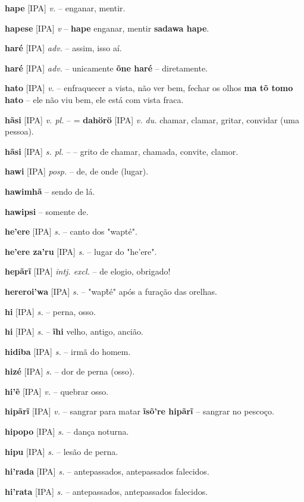 \textbf{hape} [IPA] \textit{v.} -- enganar, mentir.

\textbf{hapese} [IPA] \textit{v} -- \textbf{hape} enganar, mentir  \textbf{sadawa hape}.

\textbf{haré} [IPA] \textit{adv.} -- assim, isso aí.

\textbf{haré} [IPA] \textit{adv.} -- unicamente  \textbf{õne haré} -- diretamente.

\textbf{hato} [IPA] \textit{v.} -- enfraquecer a vista, não ver bem, fechar os olhos  \textbf{ma tõ tomo hato} -- ele não viu bem, ele está com vista fraca.

\textbf{hãsi} [IPA] \textit{v. pl.} -- = \textbf{dahörö} [IPA] \textit{v. du.} chamar, clamar, gritar, convidar (uma pessoa).

\textbf{hãsi} [IPA] \textit{s. pl.} -- -- grito de chamar, chamada, convite, clamor.

\textbf{hawi} [IPA] \textit{posp.} -- de, de onde (lugar).

\textbf{hawimhã} -- sendo de lá.

\textbf{hawipsi} -- somente de.

\textbf{he'ere} [IPA] \textit{s.} -- canto dos "wapté".

\textbf{he'ere za'ru} [IPA] \textit{s.} -- lugar do "he'ere".

\textbf{hepãrĩ} [IPA] \textit{intj. excl.} -- de elogio, obrigado!

\textbf{hereroi'wa} [IPA] \textit{s.} -- "wapt̃é" após a furação das orelhas.

\textbf{hi} [IPA] \textit{s.} -- perna, osso.

\textbf{hi} [IPA] \textit{s.} -- \textbf{ĩhi} velho, antigo, ancião.

\textbf{hidiba} [IPA] \textit{s.} -- irmã do homem.

\textbf{hizé} [IPA] \textit{s.} -- dor de perna (osso).

\textbf{hi'ẽ} [IPA] \textit{v.} -- quebrar osso.

\textbf{hipãrĩ} [IPA] \textit{v.} -- sangrar para matar  \textbf{ĩsõ're hipãrĩ} -- sangrar no pescoço.

\textbf{hipopo} [IPA] \textit{s.} -- dança noturna.

\textbf{hipu} [IPA] \textit{s.} -- lesão de perna.

\textbf{hi'rada} [IPA] \textit{s.} -- antepassados, antepassados falecidos.

\textbf{hi'rata} [IPA] \textit{s.} -- antepassados, antepassados falecidos.

